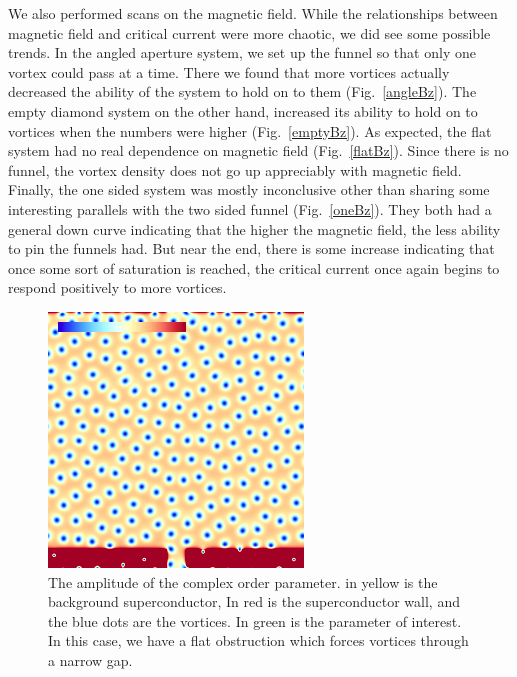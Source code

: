 We also performed scans on the magnetic field.  While the relationships between magnetic field and critical current were more chaotic, we did see some possible trends. In the angled aperture system, we set up the funnel so that only one vortex could pass at a time. There we found that more vortices actually decreased the ability of the system to hold on to them (Fig.~\ref{angleBz}). The empty diamond system on the other hand, increased its ability to hold on to vortices when the numbers were higher (Fig.~\ref{emptyBz}). As expected, the flat system had no real dependence on magnetic field (Fig.~\ref{flatBz}). Since there is no funnel, the vortex density does not go up appreciably with magnetic field. Finally, the one sided system was mostly inconclusive other than sharing some interesting parallels with the two sided funnel (Fig.~\ref{oneBz}). They both had a general down curve indicating that the higher the magnetic field, the less ability to pin the funnels had. But near the end, there is some increase indicating that once some sort of saturation is reached, the critical current once again begins to respond positively to more vortices.   
\begin{figure}[htbp]
\begin{center}
\includegraphics[scale=.50]{ratchetNoAngle.png}
\caption{ The amplitude of the complex order parameter. in yellow is the background superconductor, In red is the superconductor wall, and the blue dots are the vortices. In green is the parameter of interest. In this case, we have a flat obstruction which forces vortices through a narrow gap.}
\label{noAngle}
\end{center}
\end{figure}

